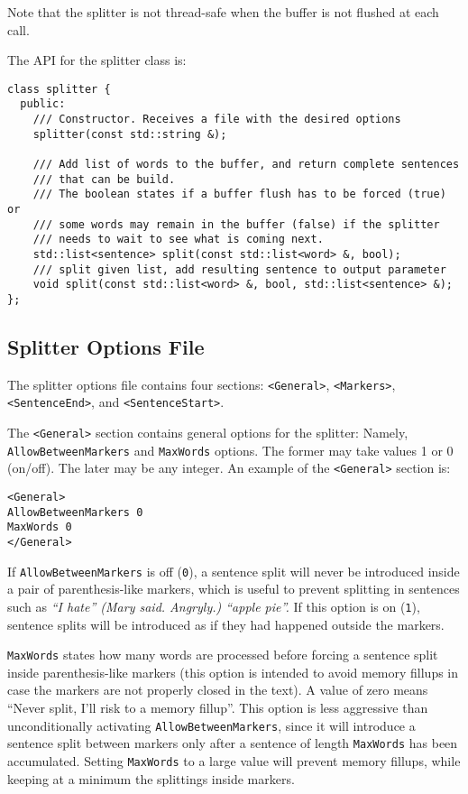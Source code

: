 \documentclass[a4paper]{book}
\begin{document}
  Note that the splitter is not thread-safe when the buffer is not
  flushed at each call.

 The API for the splitter class is:
\begin{verbatim}
class splitter {
  public:
    /// Constructor. Receives a file with the desired options
    splitter(const std::string &);

    /// Add list of words to the buffer, and return complete sentences 
    /// that can be build.
    /// The boolean states if a buffer flush has to be forced (true) or
    /// some words may remain in the buffer (false) if the splitter 
    /// needs to wait to see what is coming next.
    std::list<sentence> split(const std::list<word> &, bool);
    /// split given list, add resulting sentence to output parameter
    void split(const std::list<word> &, bool, std::list<sentence> &);
};
\end{verbatim}

\subsection{Splitter Options File}

The splitter options file contains four sections: \verb#<General>#, \verb#<Markers>#,
\verb#<SentenceEnd>#, and \verb#<SentenceStart>#.

The \verb#<General># section contains general options for the
splitter: Namely, {\tt AllowBetweenMarkers} and {\tt MaxWords}
options. The former may take values 1 or 0 (on/off). The
later may be any integer. An example of the  \verb#<General># section is:
\begin{verbatim}
<General>
AllowBetweenMarkers 0
MaxWords 0
</General>
\end{verbatim}

If {\tt AllowBetweenMarkers} is off ({\tt 0}), a sentence split will never be
introduced inside a pair of parenthesis-like markers, which is useful
to prevent splitting in sentences such as {\em ``I hate'' (Mary
said. Angryly.) ``apple pie''.}
 If this option is on ({\tt 1}), sentence splits will be introduced as if 
they had happened outside the markers.

{\tt MaxWords} states how many words are processed before forcing a
sentence split inside parenthesis-like markers (this option is
intended to avoid memory fillups in case the markers are not properly
closed in the text).  A value of zero means ``Never split, I'll risk
to a memory fillup''.  This option is less aggressive than
unconditionally activating {\tt AllowBetweenMarkers}, since it will
introduce a sentence split between markers only after a sentence of
length {\tt MaxWords} has been accumulated. Setting {\tt MaxWords} to 
a large value will prevent memory fillups, while keeping at a minimum the 
splittings inside markers.
\end{document}
